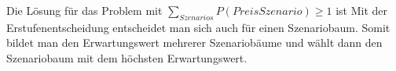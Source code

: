 \documentclass[british,         %
BCOR=2mm,                       %
11pt,                           %
a4paper,						%
oneside,						%
cdgeometry,                     %
toc=chapterentrydotfill,        %
toc=indent,                     %
bibliography=totoc,         	%
listof=totoc,                   %
numbers=noenddot,				%
parskip=full,                   %
cdmath=false					%
]{article}                  %
\begin{document}

Die Lösung für das Problem mit $\sum_{Szenarios} P(PreisSzenario) \geq 1 $ ist 
Mit der Erstufenentscheidung entscheidet man sich auch für einen Szenariobaum.
Somit bildet man den Erwartungswert mehrerer Szenariobäume und wählt dann den Szenariobaum mit dem höchsten Erwartungswert.
\end{document}
